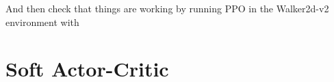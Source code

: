 \documentclass[letterpaper,10pt,english]{sphinxmanual}
\begin{document}
And then check that things are working by running PPO in the Walker2d-v2 environment with

\begin{sphinxVerbatim}[commandchars=\\\{\}]
         
\end{sphinxVerbatim}


\chapter{Soft Actor-Critic}
\label{\detokenize{algorithms/sac:soft-actor-critic}}\label{\detokenize{algorithms/sac::doc}}
\end{document}
